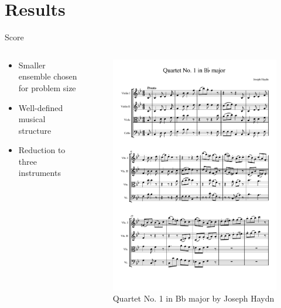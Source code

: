 \documentclass{beamer}
\begin{document}
\section{Results} %

\begin{frame}{Score}

    \begin{columns}
        \begin{column}{.6\textwidth}
            \begin{itemize}[<+(1)->]
                \item Smaller ensemble chosen for problem size
                \item Well-defined musical structure
                \item Reduction to three instruments
            \end{itemize}
        \end{column}
        \begin{column}{.4\textwidth}
            \begin{figure}
                \includegraphics[width=\textwidth, page=1]{haydn.pdf}
                \caption{Quartet No. 1 in Bb major by Joseph Haydn}
            \end{figure}
        \end{column}
    \end{columns}
    

\end{frame}
\end{document}
